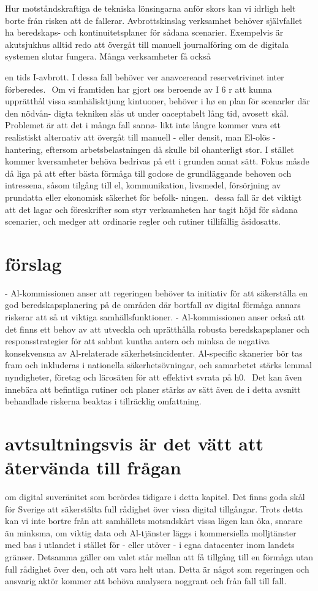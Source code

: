 {{{{{{{{Hur motståndskraftiga de tekniska lönsingarna anför skors kan vi idrligh helt borte från risken att de fallerar. Avbrottskinslag verksamhet behöver självfallet ha beredskaps- och kontinuitetsplaner för sådana scenarier. Exempelvis är akutsjukhus alltid redo att övergåt till manuell journalföring om de digitala systemen slutar fungera. Många verksamheter få också

en tids I-avbrott. I dessa fall behöver ver anavcereand
reservetrivinet inter förberedes. \({ }^{}\)
Om vi framtiden har gjort oss beroende av I 6 r att
kunna upprätthål vissa samhälisktjung kintuoner,
behöver i hø en plan för scenarler där den nödvån-
digta tekniken slås ut under oaceptabelt lång tid,
avosett skål. Problemet är att det i många fall sannø-
likt inte långre kommer vara ett realistiskt alternativ
att övergåt till manuell - eller densit, man El-olös
- hantering, eftersom arbetsbelastningen då skulle
bil ohanterligt stor. I stället kommer kversamheter
behöva bedrivas på ett i grunden annat sätt. Fokus
måsde då liga på att efter bästa förmåga till godose
de grundläggande behoven och intressena, såsom
tilgång till el, kommunikation, livsmedel, försörjning
av prundatta eller ekonomisk säkerhet för befolk-
ningen. \({ }^{}\) dessa fall är det viktigt att det lagar och
föreskrifter som styr verksamheten har tagit höjd för
sådana scenarier, och medger att ordinarie regler och
rutiner tillifällig åsidosatts.
\section*{förslag}
- Al-kommissionen anser att regeringen
behöver ta initiativ för att säkerställa en god
beredskapsplanering på de områden där bortfall
av digital förmåga annars riskerar att så ut viktiga
samhällsfunktioner.
- Al-kommissionen anser också att det finns ett
behov av att utveckla och uprätthålla robusta
beredskapsplaner och responsstrategier
för att sabbnt kuntha antera och minksa de
negativa konsekvensna av Al-relaterade
säkerhetsincidenter. Al-specific skanerier
bör tas fram och inkluderas i nationella
säkerhetsövningar, och samarbetet stärks
lemmal nyndigheter, företag och lärosäten för att
effektivt svrata på h0. \({ }^{}\) Det kan även innebära
att befintliga rutiner och planer stärks av sätt även
de i detta avsnitt behandlade riskerna beaktas i
tillräcklig omfattning.
\section*{avtsultningsvis är det vätt att återvända till frågan}
om digital suveränitet som berördes tidigare i detta
kapitel. Det finns goda skål för Sverige att säkerstälta
full rådighet över vissa digital tillgångar. Trots detta
kan vi inte bortre från att samhällets motsndskårt
vissa lägen kan öka, snarare än minksma, om viktig
data och Al-tjänster läggs i kommersiella molljtänster
med bas i utlandet i stället för - eller utöver - i egna
datacenter inom landets gränser. Detsamma gäller
om valet står mellan att få tillgång till en förmåga utan
full rådighet över den, och att vara helt utan. Detta är
något som regeringen och ansvarig aktör kommer att
behöva analysera noggrant och från fall till fall.
}}}}}}}}
